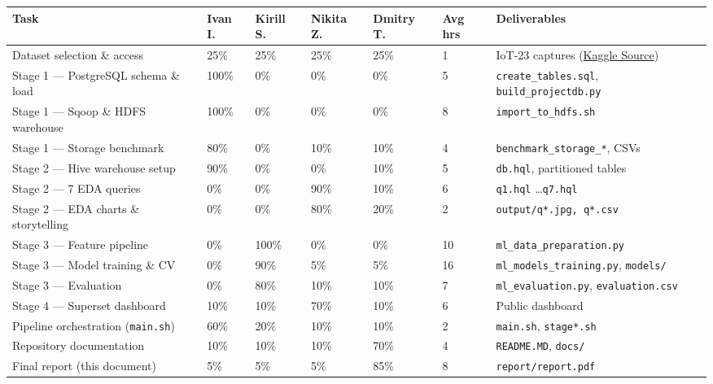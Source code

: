\documentclass[11pt,a4paper]{article}
\begin{document}
\begin{table}[H]
\centering
\small
\renewcommand{\arraystretch}{1.2}
\begin{tabular}{p{4.0cm}p{1.1cm}p{1.1cm}p{1.1cm}p{1.1cm}p{1.0cm}p{2.4cm}}
\toprule
\textbf{Task} & \textbf{Ivan I.} & \textbf{Kirill S.} & \textbf{Nikita Z.} & \textbf{Dmitry T.} & \textbf{Avg hrs} & \textbf{Deliverables} \\
\midrule
Dataset selection \& access            & 25\% & 25\% & 25\% & 25\% & 1  & IoT-23 captures (\href{https://www.kaggle.com/datasets/agungpambudi/network-malware-detection-connection-analysis?select=CTU-IoT-Malware-Capture-44-1conn.log.labeled.csv}{Kaggle Source}) \\
Stage 1 --- PostgreSQL schema \& load  & 100\% & 0\% & 0\% & 0\% & 5  & \texttt{create\_tables.sql}, \texttt{build\_projectdb.py} \\
Stage 1 --- Sqoop \& HDFS warehouse    & 100\% & 0\% &  0\% & 0\% & 8  & \texttt{import\_to\_hdfs.sh} \\
Stage 1 --- Storage benchmark          & 80\% & 0\% &  10\% & 10\% & 4  & \texttt{benchmark\_storage\_*}, CSVs \\
Stage 2 --- Hive warehouse setup       & 90\% & 0\% & 0\% & 10\% & 5  & \texttt{db.hql}, partitioned tables \\
Stage 2 --- 7 EDA queries              & 0\% &  0\% & 90\% & 10\% & 6  & \texttt{q1.hql} \dots \texttt{q7.hql} \\
Stage 2 --- EDA charts \& storytelling & 0\% &  0\% & 80\% & 20\% & 2  & \texttt{output/q*.jpg, q*.csv} \\
Stage 3 --- Feature pipeline           & 0\% & 100\% & 0\% &  0\% & 10 & \texttt{ml\_data\_preparation.py} \\
Stage 3 --- Model training \& CV       & 0\% & 90\% &  5\% &  5\% & 16 & \texttt{ml\_models\_training.py}, \texttt{models/} \\
Stage 3 --- Evaluation                 & 0\% & 80\% & 10\% & 10\% & 7  & \texttt{ml\_evaluation.py}, \texttt{evaluation.csv} \\
Stage 4 --- Superset dashboard         & 10\% & 10\% & 70\% & 10\% & 6  & Public dashboard \\
Pipeline orchestration (\texttt{main.sh}) & 60\% & 20\% & 10\% & 10\% & 2  & \texttt{main.sh}, \texttt{stage*.sh} \\
Repository documentation               & 10\% & 10\% & 10\% & 70\% & 4  & \texttt{README.MD}, \texttt{docs/} \\
Final report (this document)           &  5\% &  5\% & 5\% & 85\% & 8  & \texttt{report/report.pdf} \\

\end{tabular}
\end{table}
\end{document}
